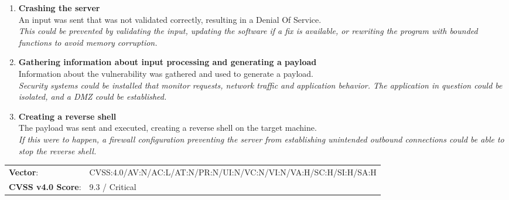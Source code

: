 \documentclass[../report.tex]{subfiles}
\begin{document}
\begin{enumerate}
\item{\textbf{Crashing the server}}\\
An input was sent that was not validated correctly, resulting in a Denial Of Service.\\
\textit{This could be prevented by validating the input, updating the software if a fix is available, or rewriting the program with bounded functions to avoid memory corruption.}

\item{\textbf{Gathering information about input processing and generating a payload}}\\
Information about the vulnerability was gathered and used to generate a payload.\\
\textit{Security systems could be installed that monitor requests, network traffic and application behavior. The application in question could be isolated, and a DMZ could be established.}

\item{\textbf{Creating a reverse shell}}\\
The payload was sent and executed, creating a reverse shell on the target machine.\\
\textit{If this were to happen, a firewall configuration preventing the server from establishing unintended outbound connections could be able to stop the reverse shell.}
\end{enumerate}

\begin{tabular}{l l}
\textbf{Vector}: & CVSS:4.0/AV:N/AC:L/AT:N/PR:N/UI:N/VC:N/VI:N/VA:H/SC:H/SI:H/SA:H\\
\textbf{CVSS v4.0 Score}: & 9.3 / Critical\\
\end{tabular}
\end{document}
